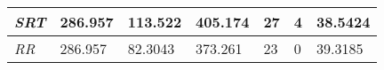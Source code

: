 \documentclass{article}
\begin{document}
\begin{table}[h!]
\begin{tabular}{|l|l|l|l|l|l|l|}
  \textit{SRT}       & 286.957                                                                          & 113.522                                                                     & 405.174                                                                            & 27                                                                                    & 4                                                                                   & 38.5424                                                                    \\ \hline
  \textit{RR}        & 286.957                                                                          & 82.3043                                                                     & 373.261                                                                            & 23                                                                                    & 0                                                                                   & 39.3185                                                                    \\ \hline
  \end{tabular}
\end{table}
\end{document}
